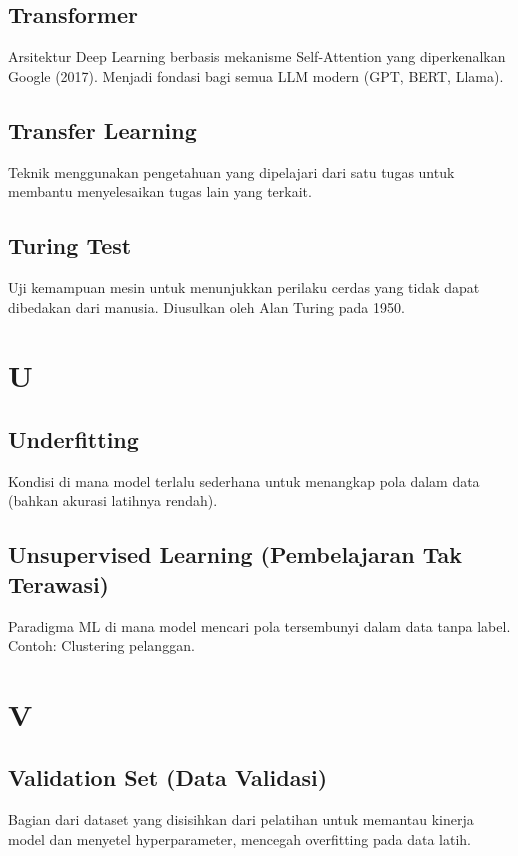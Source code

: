 \subsection*{Transformer}
Arsitektur Deep Learning berbasis mekanisme Self-Attention yang diperkenalkan Google (2017). Menjadi fondasi bagi semua LLM modern (GPT, BERT, Llama).

\subsection*{Transfer Learning}
Teknik menggunakan pengetahuan yang dipelajari dari satu tugas untuk membantu menyelesaikan tugas lain yang terkait.

\subsection*{Turing Test}
Uji kemampuan mesin untuk menunjukkan perilaku cerdas yang tidak dapat dibedakan dari manusia. Diusulkan oleh Alan Turing pada 1950.

\section*{U}

\subsection*{Underfitting}
Kondisi di mana model terlalu sederhana untuk menangkap pola dalam data (bahkan akurasi latihnya rendah).

\subsection*{Unsupervised Learning (Pembelajaran Tak Terawasi)}
Paradigma ML di mana model mencari pola tersembunyi dalam data tanpa label. Contoh: Clustering pelanggan.

\section*{V}

\subsection*{Validation Set (Data Validasi)}
Bagian dari dataset yang disisihkan dari pelatihan untuk memantau kinerja model dan menyetel hyperparameter, mencegah overfitting pada data latih.

